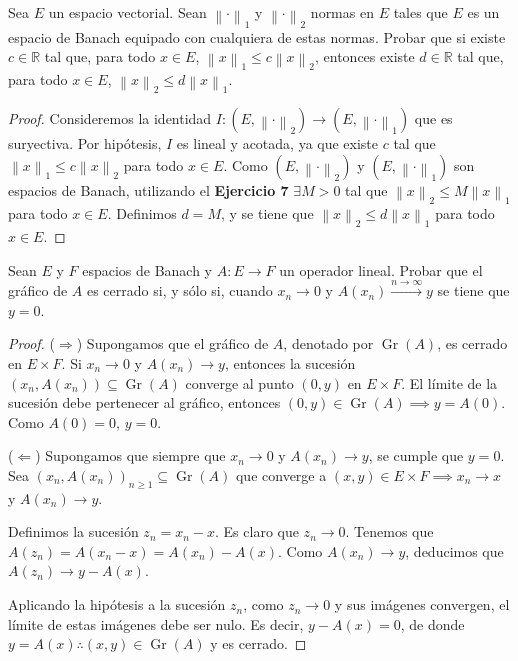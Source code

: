 \documentclass{article}
\theoremstyle{definition}
\newcommand{\R}{\mathbb{R}}
\newcommand{\norm}[1]{\left\lVert #1 \right\rVert}       %
\newenvironment{ejercicio}[1]{\begin{trivlist}
\item[\hskip \labelsep {\bfseries Ejercicio}\hskip \labelsep {\bfseries #1.}]}{\end{trivlist}}
\begin{document}
\vspace{0.5cm}

\begin{ejercicio}{9}
    Sea \(E\) un espacio vectorial. Sean \(\norm{\cdot}_{1}\) y \(\norm{\cdot}_{2}\) normas en \(E\) tales que \(E\) es un espacio de Banach equipado con cualquiera de estas normas. Probar que si existe \( c\in\R \) tal que, para todo \(x\in E\), \(\norm{x}_{1}\le c\norm{x}_{2}\), entonces existe \( d\in\R \) tal que, para todo \(x\in E\), \(\norm{x}_{2}\le d\norm{x}_{1}\).
\end{ejercicio}
\begin{proof}
    Consideremos la identidad \( I:(E,\norm{\cdot}_2)\to(E,\norm{\cdot}_1) \) que es suryectiva. Por hipótesis, \( I \) es lineal y acotada, ya que existe \( c \) tal que \( \norm{x}_1\le c\norm{x}_2 \) para todo \( x\in E \). Como \( (E,\norm{\cdot}_2) \) y \( (E,\norm{\cdot}_1) \) son espacios de Banach, utilizando el \textbf{Ejercicio 7} \( \exists M > 0 \) tal que \( \norm{x}_2 \le M \norm{x}_1 \) para todo \( x \in E \). Definimos \( d = M \), y se tiene que \( \norm{x}_2 \le d \norm{x}_1 \) para todo \( x \in E \).
\end{proof}

\vspace{0.5cm}

\begin{ejercicio}{10}
    Sean \(E\) y \(F\) espacios de Banach y \(A:E\to F\) un operador lineal. Probar que el gráfico de \(A\) es cerrado si, y sólo si, cuando \(x_{n}\to0\) y \(A(x_{n})\xrightarrow{n\to\infty}y\) se tiene que \(y=0\).
\end{ejercicio}
\begin{proof}
    (\( \Longrightarrow \)) Supongamos que el gráfico de \(A\), denotado por \(\operatorname{Gr}(A)\), es cerrado en \(E \times F\). Si \(x_n \to 0\) y \(A(x_n) \to y\), entonces la sucesión \((x_n, A(x_n)) \subseteq \operatorname{Gr}(A)\) converge al punto \((0, y)\) en \(E \times F\). El límite de la sucesión debe pertenecer al gráfico, entonces \((0, y) \in \operatorname{Gr}(A) \implies y = A(0)\). Como \(A(0) = 0\), \(y = 0\).

    (\( \Longleftarrow \)) Supongamos que siempre que \(x_n \to 0\) y \(A(x_n) \to y\), se cumple que \(y = 0\). Sea \({(x_n, A(x_n))}_{n\ge1} \subseteq \operatorname{Gr}(A)\) que converge a \((x, y) \in E \times F \implies x_n \to x\) y \(A(x_n) \to y\).

    Definimos la sucesión \(z_n = x_n - x\). Es claro que \(z_n \to 0\). Tenemos que \(A(z_n) = A(x_n - x) = A(x_n) - A(x)\). Como \(A(x_n) \to y\), deducimos que \(A(z_n) \to y - A(x)\).

    Aplicando la hipótesis a la sucesión \(z_n\), como \(z_n \to 0\) y sus imágenes convergen, el límite de estas imágenes debe ser nulo. Es decir, \(y - A(x) = 0\), de donde \(y = A(x) \therefore (x, y) \in \operatorname{Gr}(A)\) y es cerrado.
\end{proof}
\end{document}
